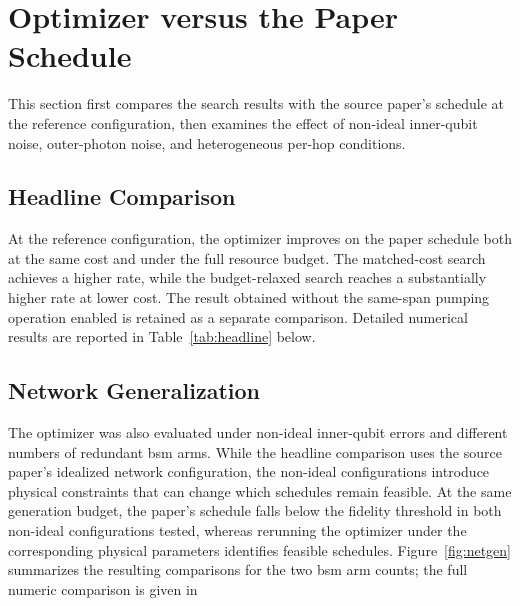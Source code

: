 \section{Optimizer versus the Paper Schedule}
\label{sec:exp:comparison}

This section first compares the search results with the source paper's schedule at the reference configuration, then examines the effect of non-ideal inner-qubit noise, outer-photon noise, and heterogeneous per-hop conditions.

\subsection{Headline Comparison}
\label{sec:exp:headline}


At the reference configuration, the optimizer improves on the paper schedule both at the same cost and under the full resource budget. The matched-cost search achieves a higher rate, while the budget-relaxed search reaches a substantially higher rate at lower cost. The result obtained without the same-span pumping operation enabled is retained as a separate comparison. Detailed numerical results are reported in Table~\ref{tab:headline} below.



\subsection{Network Generalization}
\label{sec:exp:netgen}


The optimizer was also evaluated under non-ideal inner-qubit errors and different numbers of redundant \Gls{bsm} arms. While the headline comparison uses the source paper's idealized network configuration, the non-ideal configurations introduce physical constraints that can change which schedules remain feasible. At the same generation budget, the paper's schedule falls below the fidelity threshold in both non-ideal configurations tested, whereas rerunning the optimizer under the corresponding physical parameters identifies feasible schedules. Figure~\ref{fig:netgen} summarizes the resulting comparisons for the two \Gls{bsm} arm counts; the full numeric comparison is given in 

